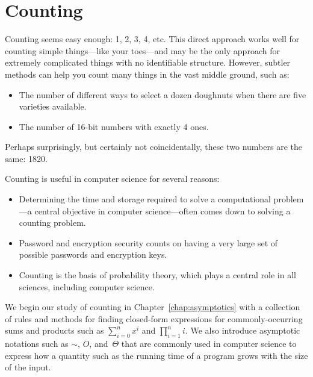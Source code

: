 \part{Counting}
\label{part:counting}

\partintro
{}

Counting seems easy enough: 1, 2, 3, 4, etc.  This direct approach
works well for counting simple things---like your toes---and may be
the only approach for extremely complicated things with no
identifiable structure.  However, subtler methods can help you count
many things in the vast middle ground, such as:
\begin{itemize}

\item The number of different ways to select a dozen doughnuts when
there are five varieties available.

\item The number of 16-bit numbers with exactly 4 ones.

\end{itemize}
Perhaps surprisingly, but certainly not coincidentally, these two
numbers are the same: 1820.

Counting is useful in computer science for several reasons:
\begin{itemize}

\item
Determining the time and storage required to solve a computational
problem---a central objective in computer science---often comes down
to solving a counting problem.

\item Password and encryption security counts on having a very large
  set of possible passwords and encryption keys.

\item
Counting is the basis of probability theory, which plays a central
role in all sciences, including computer science.

\iffalse

\item
Two remarkable proof techniques, the ``\idx{pigeonhole principle}''
and ``\idx{combinatorial proof},'' rely on counting.
These lead to a variety of interesting and useful insights.
\fi

\end{itemize}


We begin our study of counting in Chapter~\ref{chap:asymptotics} with
a collection of rules and methods for finding closed-form expressions
for commonly-occurring sums and products such as $\sum_{i = 0}^n x^i$
and $\prod_{i=1}^n i$.  We also introduce asymptotic notations
such as $\sim$, $O$, and~$\Theta$ that are commonly used in computer
science to express how a quantity such as the running time of a
program grows with the size of the input.

